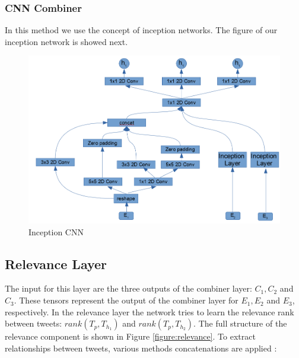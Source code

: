 \documentclass[12pt]{report}
\begin{document}
  
\subsubsection{\ac{CNN} Combiner}

In this method we use the concept of inception networks. The figure of our inception network is showed next.

\begin{figure}[H]	
	\centering
	\includegraphics[width=150mm, scale = 1]{images/16_cnn_model.png}	
	\caption{Inception \ac{CNN}}	
	\label{figure:cnn_combiner}
\end{figure}

\subsection{Relevance Layer}

The input for this layer are the three outputs of the combiner layer: $C_1, C_2$ and $C_3$. These tensors represent 
the output of the combiner layer for $E_1, E_2$ and $E_3$, respectively.  In the relevance layer the network tries to learn the relevance rank between tweets: 
$rank(T_p, T_{h_1})$ and $rank(T_p, T_{h_2})$.  The full structure of the relevance component is shown in Figure \ref{figure:relevance}.
To extract relationships between tweets, various methods concatenations are applied : 
\end{document}
